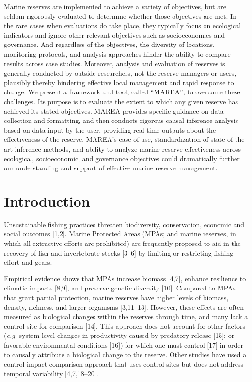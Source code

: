 \documentclass[12pt,]{article}
\begin{document}
Marine reserves are implemented to achieve a variety of objectives, but
are seldom rigorously evaluated to determine whether those objectives
are met. In the rare cases when evaluations do take place, they
typically focus on ecological indicators and ignore other relevant
objectives such as socioeconomics and governance. And regardless of the
objectives, the diversity of locations, monitoring protocols, and
analysis approaches hinder the ability to compare results across case
studies. Moreover, analysis and evaluation of reserves is generally
conducted by outside researchers, not the reserve managers or users,
plausibly thereby hindering effective local management and rapid
response to change. We present a framework and tool, called ``MAREA'',
to overcome these challenges. Its purpose is to evaluate the extent to
which any given reserve has achieved its stated objectives. MAREA
provides specific guidance on data collection and formatting, and then
conducts rigorous causal inference analysis based on data input by the
user, providing real-time outputs about the effectiveness of the
reserve. MAREA's ease of use, standardization of state-of-the-art
inference methods, and ability to analyze marine reserve effectiveness
across ecological, socioeconomic, and governance objectives could
dramatically further our understanding and support of effective marine
reserve management.

\section{Introduction}\label{introduction}

Unsustainable fishing practices threaten biodiversity, conservation,
economic and social outcomes {[}1,2{]}. Marine Protected Areas (MPAs;
and marine reserves, in which all extractive efforts are prohibited) are
frequently proposed to aid in the recovery of fish and invertebrate
stocks {[}3--6{]} by limiting or restricting fishing effort and gears.

Empirical evidence shows that MPAs increase biomass {[}4,7{]}, enhance
resilience to climatic impacts {[}8,9{]}, and preserve genetic diversity
{[}10{]}. Compared to MPAs that grant partial protection, marine
reserves have higher levels of biomass, density, richness, and larger
organisms {[}3,11--13{]}. However, these effects are often measured as
biological changes within the reserves through time, and many lack a
control site for comparison {[}14{]}. This approach does not account for
other factors (\emph{e.g.} system-level changes in productivity caused
by predatory release {[}15{]}; or favorable environmental conditions
{[}16{]}) for which one must control {[}17{]} in order to causally
attribute a biological change to the reserve. Other studies have used a
control-impact comparison approach that uses control sites but does not
address temporal variability {[}4,7,18--20{]}.
\end{document}
